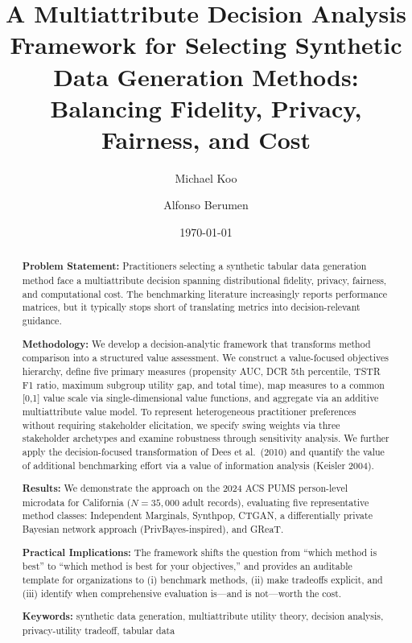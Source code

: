\documentclass[12pt,a4paper]{article}
\title{\textbf{A Multiattribute Decision Analysis Framework for Selecting Synthetic Data Generation Methods: Balancing Fidelity, Privacy, Fairness, and Cost}}
\author{Michael Koo \and Alfonso Berumen}
\date{\today}
\begin{document}
\maketitle

\begin{abstract}
\noindent\textbf{Problem Statement:} Practitioners selecting a synthetic tabular data generation method face a multiattribute decision spanning distributional fidelity, privacy, fairness, and computational cost. The benchmarking literature increasingly reports performance matrices, but it typically stops short of translating metrics into decision-relevant guidance.

\noindent\textbf{Methodology:} We develop a decision-analytic framework that transforms method comparison into a structured value assessment. We construct a value-focused objectives hierarchy, define five primary measures (propensity AUC, DCR 5th percentile, TSTR F1 ratio, maximum subgroup utility gap, and total time), map measures to a common [0,1] value scale via single-dimensional value functions, and aggregate via an additive multiattribute value model. To represent heterogeneous practitioner preferences without requiring stakeholder elicitation, we specify swing weights via three stakeholder archetypes and examine robustness through sensitivity analysis. We further apply the decision-focused transformation of Dees et al.\ (2010) and quantify the value of additional benchmarking effort via a value of information analysis (Keisler 2004).

\noindent\textbf{Results:} We demonstrate the approach on the 2024 ACS PUMS person-level microdata for California ($N=35{,}000$ adult records), evaluating five representative method classes: Independent Marginals, Synthpop, CTGAN, a differentially private Bayesian network approach (PrivBayes-inspired), and GReaT.

\noindent\textbf{Practical Implications:} The framework shifts the question from ``which method is best'' to ``which method is best for your objectives,'' and provides an auditable template for organizations to (i) benchmark methods, (ii) make tradeoffs explicit, and (iii) identify when comprehensive evaluation is---and is not---worth the cost.

\vspace{0.5em}
\noindent\textbf{Keywords:} synthetic data generation, multiattribute utility theory, decision analysis, privacy-utility tradeoff, tabular data
\end{abstract}
\end{document}
